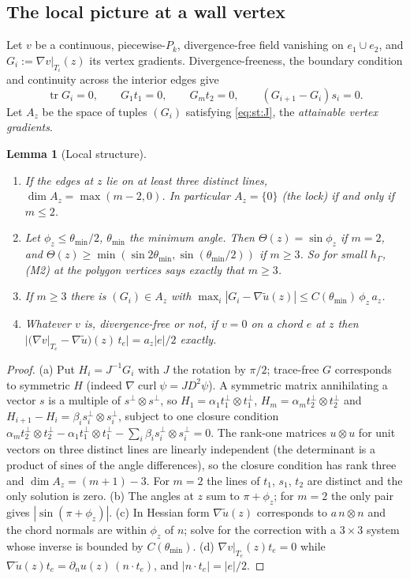 \documentclass[pdflatex,sn-mathphys-num]{sn-jnl}
\theoremstyle{thmstyleone}
\newtheorem{lemma}[theorem]{Lemma}
\theoremstyle{thmstylethree}
\newcommand{\hG}{h_\Gamma}
\newcommand{\dn}{\partial_n}
\newcommand{\ut}{\tilde u}
\newcommand{\curl}{\operatorname{curl}}
\begin{document}
\subsection{The local picture at a wall vertex}
Let $v$ be a continuous, piecewise-$P_k$, divergence-free field vanishing on $e_1\cup e_2$, and $G_i:=\nabla v|_{T_i}(z)$ its vertex gradients. Divergence-freeness, the boundary condition and continuity across the interior edges give
\begin{equation}\label{eq:st:J}
\operatorname{tr}G_i=0,\qquad G_1t_1=0,\qquad G_mt_2=0,\qquad (G_{i+1}-G_i)s_i=0 .
\end{equation}
Let $A_z$ be the space of tuples $(G_i)$ satisfying \eqref{eq:st:J}, the \emph{attainable vertex gradients}.

\begin{lemma}[Local structure]\label{lem:st:local}
\begin{enumerate}[label=(\alph*)]
\item If the edges at $z$ lie on at least three distinct lines, $\dim A_z=\max(m-2,0)$. In particular $A_z=\{0\}$ (the \emph{lock}) if and only if $m\le2$.
\item Let $\phi_z\le\theta_{\min}/2$, $\theta_{\min}$ the minimum angle. Then $\Theta(z)=\sin\phi_z$ if $m=2$, and $\Theta(z)\ge\min(\sin2\theta_{\min},\sin(\theta_{\min}/2))$ if $m\ge3$. So for small $\hG$, (M2) at the polygon vertices says exactly that $m\ge3$.
\item If $m\ge3$ there is $(G_i)\in A_z$ with $\max_i|G_i-\nabla\ut(z)|\le C(\theta_{\min})\,\phi_z\,a_z$.
\item Whatever $v$ is, divergence-free or not, if $v=0$ on a chord $e$ at $z$ then $|(\nabla v|_{T_e}-\nabla\ut)(z)\,t_e|=a_z|e|/2$ exactly.
\end{enumerate}
\end{lemma}

\begin{proof}
(a) Put $H_i=J^{-1}G_i$ with $J$ the rotation by $\pi/2$; trace-free $G$ corresponds to symmetric $H$ (indeed $\nabla\curl\psi=JD^2\psi$). A symmetric matrix annihilating a vector $s$ is a multiple of $s^\perp\otimes s^\perp$, so $H_1=\alpha_1t_1^\perp\otimes t_1^\perp$, $H_m=\alpha_mt_2^\perp\otimes t_2^\perp$ and $H_{i+1}-H_i=\beta_is_i^\perp\otimes s_i^\perp$, subject to one closure condition $\alpha_mt_2^\perp\otimes t_2^\perp-\alpha_1t_1^\perp\otimes t_1^\perp-\sum_i\beta_is_i^\perp\otimes s_i^\perp=0$. The rank-one matrices $u\otimes u$ for unit vectors on three distinct lines are linearly independent (the determinant is a product of sines of the angle differences), so the closure condition has rank three and $\dim A_z=(m+1)-3$. For $m=2$ the lines of $t_1$, $s_1$, $t_2$ are distinct and the only solution is zero. (b) The angles at $z$ sum to $\pi+\phi_z$; for $m=2$ the only pair gives $|\sin(\pi+\phi_z)|$. (c) In Hessian form $\nabla\ut(z)$ corresponds to $a\,n\otimes n$ and the chord normals are within $\phi_z$ of $n$; solve for the correction with a $3\times3$ system whose inverse is bounded by $C(\theta_{\min})$. (d) $\nabla v|_{T_e}(z)t_e=0$ while $\nabla\ut(z)t_e=\dn u(z)\,(n\cdot t_e)$, and $|n\cdot t_e|=|e|/2$.
\end{proof}
\end{document}
